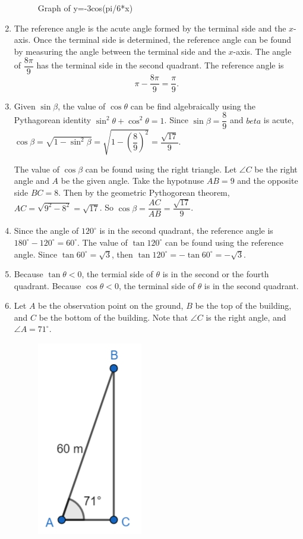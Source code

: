 \documentclass[
  12pt]{article}
\begin{document}
\begin{enumerate}
\begin{figure}[H]
  \caption{Graph of y=-3cos(pi/6*x)}

  \end{figure}%
\item
  The reference angle is the acute angle formed by the terminal side and
  the \(x\)-axis. Once the terminal side is determined, the reference
  angle can be found by measuring the angle between the terminal side
  and the \(x\)-axis. The angle of \(\dfrac{8\pi}{9}\) has the terminal
  side in the second quadrant. The reference angle is
  \[ \pi-\frac{8\pi}{9}=\frac{\pi}{9}. \]
\item
  Given \(\sin\beta\), the value of \(\cos\theta\) can be find
  algebraically using the Pythagorean identity
  \(\sin^2\theta + \cos^2\theta = 1\). Since \(\sin\beta = \dfrac89\)
  and \(beta\) is acute,
  \(\cos\beta = \sqrt{1-\sin^2\beta} = \sqrt{1-\left(\dfrac89\right)^2} = \dfrac{\sqrt{17}}{9}\).

  The value of \(\cos\beta\) can be found using the right triangle. Let
  \(\angle C\) be the right angle and \(A\) be the given angle. Take the
  hypotnuse \(AB=9\) and the opposite side \(BC=8\). Then by the
  geometric Pythogorean theorem, \(AC=\sqrt{9^2-8^2}= \sqrt{17}\). So
  \(\cos\beta = \dfrac{AC}{AB} = \dfrac{\sqrt{17}}{9}\).
\item
  Since the angle of \(120^\circ\) is in the second quadrant, the
  reference angle is \(180^\circ-120^\circ=60^\circ\). The value of
  \(\tan 120^\circ\) can be found using the reference angle. Since
  \(\tan 60^\circ = \sqrt{3}\), then
  \(\tan 120^\circ = -\tan 60^\circ = -\sqrt{3}\).
\item
  Because \(\tan\theta < 0\), the termial side of \(\theta\) is in the
  second or the fourth quadrant. Because \(\cos\theta < 0\), the
  terminal side of \(\theta\) is in the second quadrant.
\item
  Let \(A\) be the observation point on the ground, \(B\) be the top of
  the building, and \(C\) be the bottom of the building. Note that
  \(\angle C\) is the right angle, and \(\angle A =71^\circ\).

  \begin{figure}[H]

  {\centering \includegraphics{Q16.jpeg}

}
\end{figure}
\end{enumerate}
\end{document}
